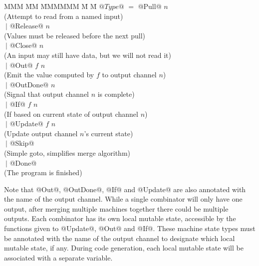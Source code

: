\begin{tabbing}
MMM \= MM \= MMMMMM \= M \= M \kill
$@Type@$ \> $=$ \> @Pull@     \>     \> $n$         \\
         \>     \> (Attempt to read from a named input) \\

         \> $~|$\> @Release@  \>     \> $n$         \\
         \>     \> (Values must be released before the next pull) \\

         \> $~|$\> @Close@    \>     \> $n$         \\
         \>     \> (An input may still have data, but we will not read it) \\

         \> $~|$\> @Out@      \> $f$ \> $n$         \\
         \>     \> (Emit the value computed by $f$ to output channel $n$) \\

         \> $~|$\> @OutDone@  \>     \> $n$         \\
         \>     \> (Signal that output channel $n$ is complete) \\

         \> $~|$\> @If@       \> $f$ \> $n$         \\
         \>     \> (If based on current state of output channel $n$) \\

         \> $~|$\> @Update@   \> $f$ \> $n$         \\
         \>     \> (Update output channel $n$'s current state) \\

         \> $~|$\> @Skip@     \>                    \\
         \>     \> (Simple goto, simplifies merge algorithm) \\

         \> $~|$\> @Done@     \>                    \\
         \>     \> (The program is finished) \\
\end{tabbing}

Note that @Out@, @OutDone@, @If@ and @Update@ are also annotated with the name of the output channel.
While a single combinator will only have one output, after merging multiple machines together there could be multiple outputs.
Each combinator has its own local mutable state, accessible by the functions given to @Update@, @Out@ and @If@.
These machine state types must be annotated with the name of the output channel to designate which local mutable state, if any.
During code generation, each local mutable state will be associated with a separate variable.

